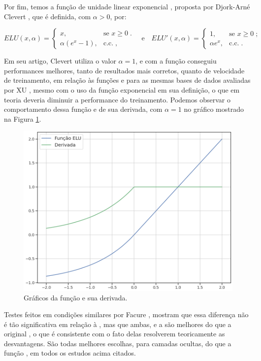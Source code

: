 Por fim, temos a função de unidade linear exponencial , proposta por Djork-Arné Clevert \citep{clevert}, que é definida, com $\alpha > 0$, por:

\[
ELU(x, \alpha)=
	\begin{cases}
    	x, & \text{se } x\ge 0\;.\\
    	\alpha(e^x - 1), & \text{c.c.}\;,
	\end{cases}
\quad \text{e} \quad
ELU'(x, \alpha)=
	\begin{cases}
    	1, & \text{se } x\ge 0\;;\\
    	\alpha e^x, & \text{c.c.}\;.
	\end{cases} 
\]

Em seu artigo, Clevert \citep{clevert} utiliza o valor $\alpha = 1$, e com a função  conseguiu performances melhores, tanto de resultados mais corretos, quanto de velocidade de treinamento, em relação às funções  e  para as mesmas bases de dados avaliadas por XU \citep{xu_relu}, mesmo com o uso da função exponencial em sua definição, o que em teoria deveria diminuir a performance do treinamento. Podemos observar o comportamento dessa função e de sua derivada, com $\alpha = 1$ no gráfico mostrado na Figura \ref{fig:elu}.

\begin{figure}[htb]
\centering
\includegraphics[width=12cm]{figuras/elu}
\caption{Gráficos da função  e sua derivada.}
\label{fig:elu}
\end{figure}

Testes feitos em condições similares por Facure \citep{matheus}, mostram que essa diferença não é tão significativa em relação à , mas que ambas,  e a  são melhores do que a original , o que é consistente com o fato delas resolverem teoricamente as desvantagens. São todas melhores escolhas, para camadas ocultas, do que a função , em todos os estudos acima citados.

